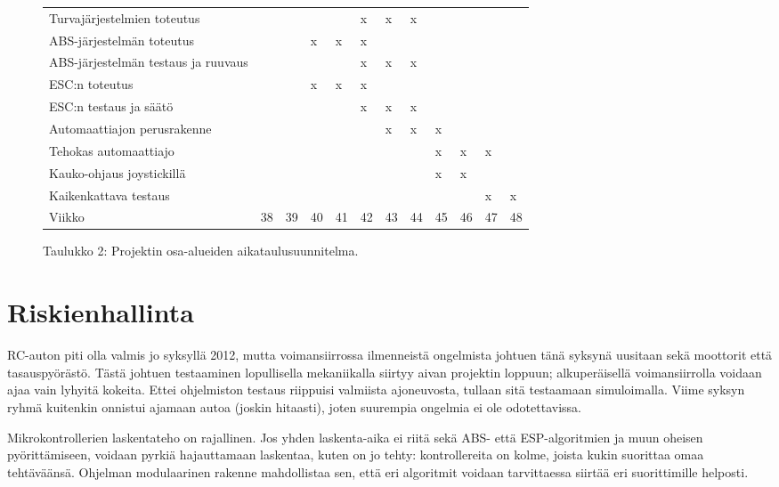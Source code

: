 \documentclass{article}
\begin{document}
\begin{figure}[H]
\begin{tabular}{l|l|l|l|l|l|l|l|l|l|l|l|}
		Turvajärjestelmien toteutus 
		&   &   &   &   & x & x & x &   &   &   &   \\
		ABS-järjestelmän toteutus
		&   &   & x & x & x &   &   &   &   &   &   \\
		ABS-järjestelmän testaus ja ruuvaus
		&   &   &   &   & x & x & x &   &   &   &   \\
		ESC:n toteutus
		&   &   & x & x & x &   &   &   &   &   &   \\
		ESC:n testaus ja säätö
		&   &   &   &   & x & x & x &   &   &   &   \\
		Automaattiajon perusrakenne
		&   &   &   &   &   & x & x & x &   &   &   \\
		Tehokas automaattiajo
		&   &   &   &   &   &   &   & x & x & x &   \\
		Kauko-ohjaus joystickillä
		&   &   &   &   &   &   &   & x & x &   &   \\
		Kaikenkattava testaus
		&   &   &   &   &   &   &   &   &   & x & x  \\

		\hline
		Viikko & 38 & 39 & 40 & 41 & 42 & 43 & 44 & 45 & 46 & 47 & 48
	\end{tabular}
	\label{fig:aikataulu}
	\caption{Taulukko 2: Projektin osa-alueiden aikataulusuunnitelma.}
\end{figure}

\section{Riskienhallinta}

RC-auton piti olla valmis jo syksyllä 2012, mutta voimansiirrossa ilmenneistä ongelmista johtuen tänä syksynä uusitaan sekä moottorit että tasauspyörästö. Tästä johtuen testaaminen lopullisella mekaniikalla siirtyy aivan projektin loppuun; alkuperäisellä voimansiirrolla voidaan ajaa vain lyhyitä kokeita. Ettei ohjelmiston testaus riippuisi valmiista ajoneuvosta, tullaan sitä testaamaan simuloimalla. Viime syksyn ryhmä kuitenkin onnistui ajamaan autoa (joskin hitaasti), joten suurempia ongelmia ei ole odotettavissa.

Mikrokontrollerien laskentateho on rajallinen. Jos yhden laskenta-aika ei riitä sekä ABS- että ESP-algoritmien ja muun oheisen pyörittämiseen, voidaan pyrkiä hajauttamaan laskentaa, kuten on jo tehty: kontrollereita on kolme, joista kukin suorittaa omaa tehtäväänsä. Ohjelman modulaarinen rakenne mahdollistaa sen, että eri algoritmit voidaan tarvittaessa siirtää eri suorittimille helposti.
\end{document}
